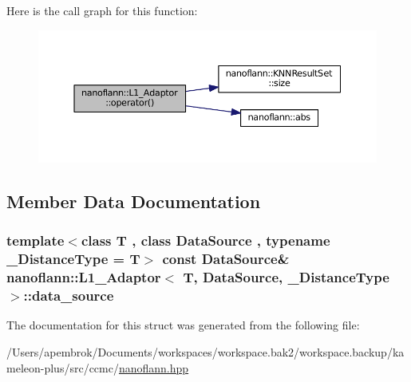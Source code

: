 Here is the call graph for this function\-:
\nopagebreak
\begin{figure}[H]
\begin{center}
\leavevmode
\includegraphics[width=350pt]{structnanoflann_1_1_l1___adaptor_a84e509cc50ad2bb6bc3fbe9f073ea4e3_cgraph}
\end{center}
\end{figure}




\subsection{Member Data Documentation}
\hypertarget{structnanoflann_1_1_l1___adaptor_af5ffa8683071c1452a4619cce0a6f707}{
\subsubsection[{data\-\_\-source}]{\setlength{\rightskip}{0pt plus 5cm}template$<$class T , class Data\-Source , typename \-\_\-\-Distance\-Type  = T$>$ const Data\-Source\& {\bf nanoflann\-::\-L1\-\_\-\-Adaptor}$<$ T, Data\-Source, \-\_\-\-Distance\-Type $>$\-::data\-\_\-source}}\label{structnanoflann_1_1_l1___adaptor_af5ffa8683071c1452a4619cce0a6f707}


The documentation for this struct was generated from the following file\-:\begin{DoxyCompactItemize}
\item 
/\-Users/apembrok/\-Documents/workspaces/workspace.\-bak2/workspace.\-backup/kameleon-\/plus/src/ccmc/\hyperlink{nanoflann_8hpp}{nanoflann.\-hpp}\end{DoxyCompactItemize}
